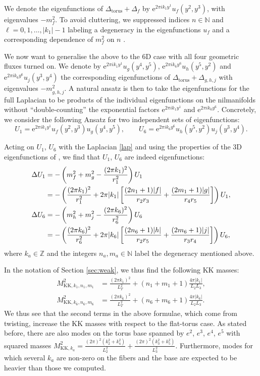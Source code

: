\documentclass[11pt]{article}
\newcommand{\nll}{\notag \\ &}
\renewcommand{\[}{\left[}
\renewcommand{\]}{\right]}
\renewcommand{\(}{\left(}
\renewcommand{\)}{\right)}
\newcommand{\e}{\textrm{e}}
\newcommand{\<}{\langle}
\renewcommand{\>}{\rangle}
\begin{document}
We denote the eigenfunctions of $\Delta_\text{torus} + \Delta_f$ by $\e^{2\pi i k_1y^1}u_f(y^2,y^3)$, with eigenvalues $-m_f^2$. To avoid cluttering, we suppressed indices $n\in \mathbb{N}$ and $\ell=0,1,\ldots, |k_1|-1$ labeling a degeneracy in the eigenfunctions $u_f$ and a corresponding dependence of $m_f^2$ on $n$ \cite{Andriot:2016rdd}.

We now want to generalise the above to the 6D case with all four geometric fluxes turned on. We denote by $\e^{2\pi i k_1y^1}u_g(y^4,y^5)$, $\e^{2\pi i k_6 y^6}u_h(y^5,y^2)$ and $\e^{2\pi i k_6y^6}u_j(y^3,y^4)$ the corresponding eigenfunctions of $\Delta_\text{torus} + \Delta_{g,h,j}$ with eigenvalues $-m^2_{g,h,j}$. A natural ansatz is then to take the eigenfunctions for the full Laplacian to be products of the individual eigenfunctions on the nilmanifolds without ``double-counting'' the exponential factors $\e^{2\pi i k_1y^1}$ and $\e^{2\pi i k_6y^6}$. Concretely, we consider the following Ansatz for two independent sets of eigenfunctions:
\begin{equation}
U_1=\e^{2\pi i k_1 y^1}u_f(y^2,y^3) u_g(y^4,y^5), \qquad U_6=\e^{2\pi i k_6y^6}u_h(y^5,y^2) u_j(y^3,y^4).
\end{equation}

Acting on $U_1$, $U_6$ with the Laplacian \eqref{lap} and using the properties of the 3D eigenfunctions of \cite{Andriot:2016rdd}, we find that $U_1$, $U_6$ are indeed eigenfunctions:
\begin{align}
\Delta U_1 &= -\left(m_f^2+m_g^2- \frac{(2\pi k_1)^2}{r_1^2}\right)U_1 \nll = -\left( \frac{(2\pi k_1)^2}{r_1^2} + 2\pi|k_1| \left[\frac{(2n_1+1)|f|}{r_2r_3} + \frac{(2m_1+1)|g|}{r_4r_5}\right] \right)U_1, \\
\Delta U_6 &= -\left(m_h^2+m_j^2- \frac{(2\pi k_6)^2}{r_6^2}\right)U_6 \nll = -\left( \frac{(2\pi k_6)^2}{r_6^2} + 2\pi|k_6| \left[\frac{(2n_6+1)|h|}{r_2r_5} + \frac{(2m_6+1)|j|}{r_3r_4}\right] \right)U_6,
\end{align}
where $k_a \in \mathbb{Z}$ and the integers $n_a,m_a\in \mathbb{N}$ label the degeneracy mentioned above.

In the notation of Section \ref{sec:weak}, we thus find the following KK masses:
\begin{align}
M_{\text{KK},k_1,n_1,m_1}^2 &= \frac{(2\pi k_1)^2}{L_T^2} + (n_1+m_1+1) \frac{4\pi|k_1|}{L_2L_3}, \\
M_{\text{KK},k_6,n_6,m_6}^2 &= \frac{(2\pi k_6)^2}{L_T^2} + (n_6+m_6+1) \frac{4\pi|k_6|}{L_2L_3}.
\end{align}
We thus see that the second terms in the above formulae, which come from twisting, increase the KK masses with respect to the flat-torus case.
As stated before, there are also modes on the torus base spanned by $e^2$, $e^3$, $e^4$, $e^5$ with squared masses $M_{\text{KK},k_a}^2=\frac{(2\pi)^2 (k_2^2+k_4^2)}{L_2^2}+\frac{(2\pi)^2 (k_3^2+k_5^2)}{L_3^2}$. Furthermore, modes for which several $k_a$ are non-zero on the fibers and the base are expected to be heavier than those we computed.
\end{document}
